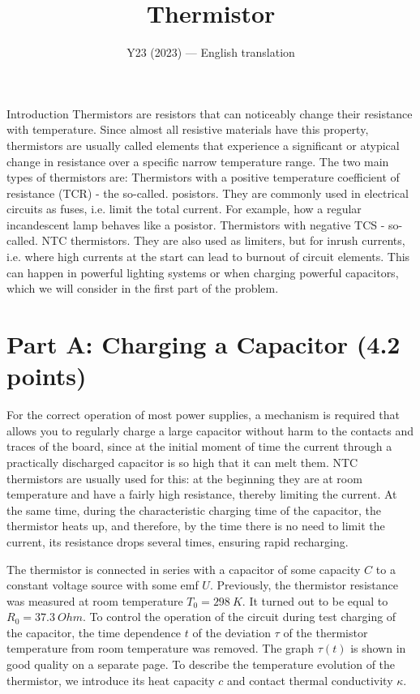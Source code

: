 \documentclass[11pt,a4paper]{article}
\title{\textbf{Thermistor}}
\author{\normalsize Y23 (2023) --- English translation}
\date{}
\begin{document}
\maketitle

Introduction Thermistors are resistors that can noticeably change their resistance with temperature. Since almost all resistive materials have this property, thermistors are usually called elements that experience a significant or atypical change in resistance over a specific narrow temperature range. The two main types of thermistors are: Thermistors with a positive temperature coefficient of resistance (TCR) - the so-called. posistors. They are commonly used in electrical circuits as fuses, i.e. limit the total current. For example, how a regular incandescent lamp behaves like a posistor. Thermistors with negative TCS - so-called. NTC thermistors. They are also used as limiters, but for inrush currents, i.e. where high currents at the start can lead to burnout of circuit elements. This can happen in powerful lighting systems or when charging powerful capacitors, which we will consider in the first part of the problem.

\section*{Part A: Charging a Capacitor (4.2 points)}

For the correct operation of most power supplies, a mechanism is required that allows you to regularly charge a large capacitor without harm to the contacts and traces of the board, since at the initial moment of time the current through a practically discharged capacitor is so high that it can melt them. NTC thermistors are usually used for this: at the beginning they are at room temperature and have a fairly high resistance, thereby limiting the current. At the same time, during the characteristic charging time of the capacitor, the thermistor heats up, and therefore, by the time there is no need to limit the current, its resistance drops several times, ensuring rapid recharging.

The thermistor is connected in series with a capacitor of some capacity $C$ to a constant voltage source with some emf $U$. Previously, the thermistor resistance was measured at room temperature $T_0=298~K$. It turned out to be equal to $R_0=37.3~Ohm$. To control the operation of the circuit during test charging of the capacitor, the time dependence $t$ of the deviation $\tau$ of the thermistor temperature from room temperature was removed. The graph $\tau(t)$ is shown in good quality on a separate page. To describe the temperature evolution of the thermistor, we introduce its heat capacity $c$ and contact thermal conductivity $\kappa$.
\end{document}
